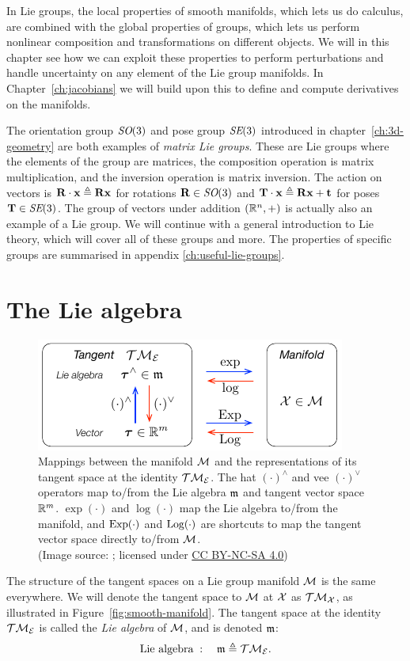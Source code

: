 In Lie groups, the local properties of smooth manifolds, which lets us do calculus, are combined with the global properties of groups, which lets us perform nonlinear composition and transformations on different objects.
We will in this chapter see how we can exploit these properties to perform perturbations and handle uncertainty on any element of the Lie group manifolds.
In Chapter~\ref{ch:jacobians} we will build upon this to define and compute derivatives on the manifolds. 

The orientation group $\textit{SO}(3)$ and pose group $\textit{SE}(3)$ introduced in chapter~\ref{ch:3d-geometry} are both examples of \emph{matrix Lie groups}.
These are Lie groups where the elements of the group are matrices, the composition operation is matrix multiplication, and the inversion operation is matrix inversion.
The action on vectors is ${\boldsymbol{\mathbf{R}}} \cdot {\boldsymbol{\mathbf{x}}} \triangleq {\boldsymbol{\mathbf{R}}} {\boldsymbol{\mathbf{x}}}$ for rotations ${\boldsymbol{\mathbf{R}}} \in \textit{SO}(3)$ and ${\boldsymbol{\mathbf{T}}} \cdot {\boldsymbol{\mathbf{x}}} \triangleq {\boldsymbol{\mathbf{R}}} {\boldsymbol{\mathbf{x}}} + {\boldsymbol{\mathbf{t}}}$ for poses ${\boldsymbol{\mathbf{T}}} \in \textit{SE}(3)$.
The group of vectors under addition $({\mathbb R}^n, +)$ is actually also an example of a Lie group.
We will continue with a general introduction to Lie theory, which will cover all of these groups and more.
The properties of specific groups are summarised in appendix \ref{ch:useful-lie-groups}.


\section{The Lie algebra}
\begin{figure}[htb]
    \centering
    \includegraphics[width=0.8\columnwidth]{figures/maps.pdf}
    \caption{Mappings between the manifold $\mathcal{M}$ and the representations of its tangent space at the identity $\mathcal{T} \mathcal{M}_{\mathcal{E}}$.
    The hat $(\cdot)^\wedge$ and vee $(\cdot)^\vee$ operators map to/from the Lie algebra ${\mathfrak{m}}$ and tangent vector space ${\mathbb R}^m$. $\exp(\cdot)$ and $\log(\cdot)$ map the Lie algebra to/from the manifold, and $\operatorname*{Exp}(\cdot)$ and $\operatorname*{Log}(\cdot)$ are shortcuts to map the tangent vector space directly to/from $\mathcal{M}$.\\
    (Image source: \cite{SolaARobotics}; licensed under \href{https://creativecommons.org/licenses/by-nc-sa/4.0/}{CC BY-NC-SA 4.0})}
    \label{fig:lie-maps}
\end{figure}
The structure of the tangent spaces on a Lie group manifold $\mathcal{M}$ is the same everywhere.
We will denote the tangent space to $\mathcal{M}$ at $\mathcal{X}$ as $\mathcal{T} \mathcal{M}_{\mathcal{X}}$, as illustrated in Figure~\ref{fig:smooth-manifold}.
The tangent space at the identity $\mathcal{T} \mathcal{M}_{\mathcal{E}}$ is called the \emph{Lie algebra} of $\mathcal{M}$, and is denoted ${\mathfrak{m}}$:
\begin{equation}
  \text{Lie algebra} \; : \quad {\mathfrak{m}} \triangleq \mathcal{T} \mathcal{M}_{\mathcal{E}}.
\end{equation}

